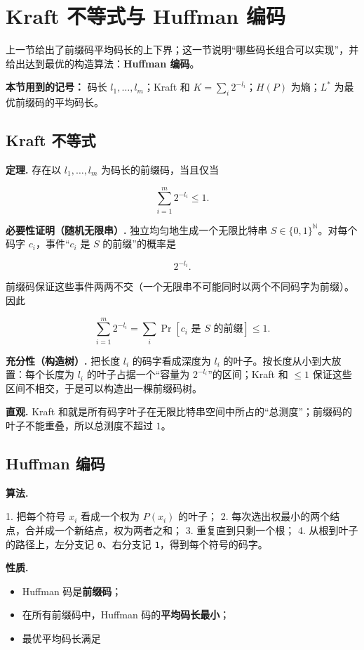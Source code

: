 \section{Kraft 不等式与 Huffman 编码}


上一节给出了前缀码平均码长的上下界；这一节说明“哪些码长组合可以实现”，并给出达到最优的构造算法：\textbf{Huffman 编码}。

\textbf{本节用到的记号：} 码长 $l_1,\dots,l_m$；Kraft 和 $K=\sum_i2^{-l_i}$；$H(P)$ 为熵；$L^*$ 为最优前缀码的平均码长。

\subsection{Kraft 不等式}


\textbf{定理.} 存在以 $l_1,\dots,l_m$ 为码长的前缀码，当且仅当

\[
\boxed{
\sum_{i=1}^m2^{-l_i}\le1
}.
\]

\textbf{必要性证明（随机无限串）.} 独立均匀地生成一个无限比特串 $S\in\{0,1\}^{\mathbb N}$。对每个码字 $c_i$，事件“$c_i$ 是 $S$ 的前缀”的概率是

\[
2^{-l_i}.
\]

前缀码保证这些事件两两不交（一个无限串不可能同时以两个不同码字为前缀）。因此

\[
\sum_{i=1}^m2^{-l_i}
=\sum_i\Pr[c_i\text{ 是 }S\text{ 的前缀}]
\le1.
\]

\textbf{充分性（构造树）.} 把长度 $l_i$ 的码字看成深度为 $l_i$ 的叶子。按长度从小到大放置：每个长度为 $l_i$ 的叶子占据一个“容量为 $2^{-l_i}$”的区间；Kraft 和 $\le1$ 保证这些区间不相交，于是可以构造出一棵前缀码树。

\textbf{直观.} Kraft 和就是所有码字叶子在无限比特串空间中所占的“总测度”；前缀码的叶子不能重叠，所以总测度不超过 $1$。

\subsection{Huffman 编码}


\textbf{算法.}

1. 把每个符号 $x_i$ 看成一个权为 $P(x_i)$ 的叶子；
2. 每次选出权最小的两个结点，合并成一个新结点，权为两者之和；
3. 重复直到只剩一个根；
4. 从根到叶子的路径上，左分支记 \texttt{0}、右分支记 \texttt{1}，得到每个符号的码字。

\textbf{性质.}

\begin{itemize}
\item Huffman 码是\textbf{前缀码}；
\item 在所有前缀码中，Huffman 码的\textbf{平均码长最小}；
\item 最优平均码长满足
\end{itemize}

